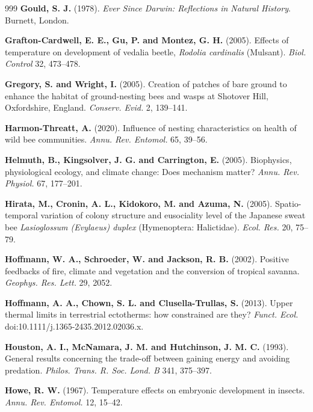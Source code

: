 \documentclass[11pt,a4paper]{article}
\begin{document}
\begin{thebibliography}{999}
\textbf{Gould, S. J.} (1978). \textit{Ever Since Darwin: Reflections in Natural History}. Burnett, London.

\textbf{Grafton-Cardwell, E. E., Gu, P. and Montez, G. H.} (2005). Effects of temperature on development of vedalia beetle, \textit{Rodolia cardinalis} (Mulsant). \textit{Biol. Control} 32, 473--478.

\textbf{Gregory, S. and Wright, I.} (2005).
Creation of patches of bare ground to enhance the habitat of ground-nesting bees and wasps at Shotover Hill, Oxfordshire, England.
\textit{Conserv. Evid.} 2, 139--141.

\textbf{Harmon-Threatt, A.} (2020).
Influence of nesting characteristics on health of wild bee communities.
\textit{Annu. Rev. Entomol.} 65, 39--56.

\textbf{Helmuth, B., Kingsolver, J. G. and Carrington, E.} (2005).
Biophysics, physiological ecology, and climate change: Does mechanism matter?
\textit{Annu. Rev. Physiol.} 67, 177--201.

\textbf{Hirata, M., Cronin, A. L., Kidokoro, M. and Azuma, N.} (2005). Spatio-temporal variation of colony structure and eusociality level of the Japanese sweat bee \textit{Lasioglossum (Evylaeus) duplex} (Hymenoptera: Halictidae). \textit{Ecol. Res.} 20, 75--79.

\textbf{Hoffmann, W. A., Schroeder, W. and Jackson, R. B.} (2002).
Positive feedbacks of fire, climate and vegetation and the conversion of tropical savanna.
\textit{Geophys. Res. Lett.} 29, 2052.

\textbf{Hoffmann, A. A., Chown, S. L. and Clusella-Trullas, S.} (2013).
Upper thermal limits in terrestrial ectotherms: how constrained are they?
\textit{Funct. Ecol.} doi:10.1111/j.1365-2435.2012.02036.x.

\textbf{Houston, A. I., McNamara, J. M. and Hutchinson, J. M. C.} (1993).
General results concerning the trade-off between gaining energy and avoiding predation.
\textit{Philos. Trans. R. Soc. Lond. B} 341, 375--397.

\textbf{Howe, R. W.} (1967). Temperature effects on embryonic development in insects. \textit{Annu. Rev. Entomol.} 12, 15--42.


\end{thebibliography}
\end{document}
